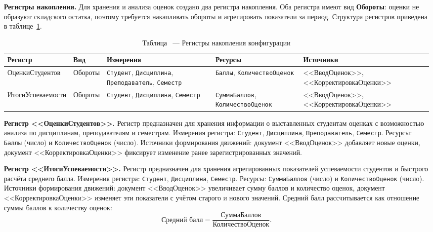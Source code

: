 \documentclass[14pt,a4paper]{extarticle}
\begin{document}
\noindent\textbf{Регистры накопления.}
Для хранения и анализа оценок создано два регистра накопления. Оба регистра
имеют вид \textbf{Обороты}: оценки не образуют складского остатка, поэтому
требуется накапливать обороты и агрегировать показатели за период. Структура
регистров приведена в таблице~\ref{tab:registers}.

\begin{table}[H]
    \centering
    \caption{Таблица \thetable\ --- Регистры накопления конфигурации}
    \label{tab:registers}
    \scriptsize
    \begin{tabularx}{\textwidth}{@{}l l
        >{\hsize=0.9\hsize\raggedright\arraybackslash}X
        >{\hsize=0.9\hsize\raggedright\arraybackslash}X
        >{\hsize=1.2\hsize\raggedright\arraybackslash}X@{}}
        \toprule
        Регистр & Вид & Измерения & Ресурсы & Источники \\
        \midrule
        ОценкиСтудентов & Обороты &
        \texttt{Студент}, \texttt{Дисциплина}, \texttt{Преподаватель},
        \texttt{Семестр} &
        \texttt{Баллы}, \texttt{КоличествоОценок} &
        <<ВводОценок>>,\newline \mbox{<<КорректировкаОценки>>} \\
        ИтогиУспеваемости & Обороты &
        \texttt{Студент}, \texttt{Дисциплина}, \texttt{Семестр} &
        \texttt{СуммаБаллов}, \texttt{КоличествоОценок} &
        <<ВводОценок>>,\newline \mbox{<<КорректировкаОценки>>} \\
        \bottomrule
    \end{tabularx}
    \addtocounter{table}{-1}
\end{table}

\noindent\textbf{Регистр <<ОценкиСтудентов>>.}
Регистр предназначен для хранения информации о выставленных студентам оценках
с возможностью анализа по дисциплинам, преподавателям и семестрам. Измерения
регистра: \texttt{Студент}, \texttt{Дисциплина}, \texttt{Преподаватель},
\texttt{Семестр}. Ресурсы: \texttt{Баллы} (число) и \texttt{КоличествоОценок}
(число). Источники формирования движений: документ <<ВводОценок>> добавляет
новые оценки, документ <<КорректировкаОценки>> фиксирует изменение ранее
зарегистрированных значений.

\noindent\textbf{Регистр <<ИтогиУспеваемости>>.}
Регистр предназначен для хранения агрегированных показателей успеваемости
студентов и быстрого расчёта среднего балла. Измерения регистра:
\texttt{Студент}, \texttt{Дисциплина}, \texttt{Семестр}. Ресурсы:
\texttt{СуммаБаллов} (число) и \texttt{КоличествоОценок} (число). Источники
формирования движений: документ <<ВводОценок>> увеличивает сумму баллов и
количество оценок, документ <<КорректировкаОценки>> изменяет эти показатели с
учётом старого и нового значений. Средний балл рассчитывается как отношение
суммы баллов к количеству оценок:
\[
    \text{Средний балл} = \frac{\texttt{СуммаБаллов}}{\texttt{КоличествоОценок}}.
\]
\end{document}
